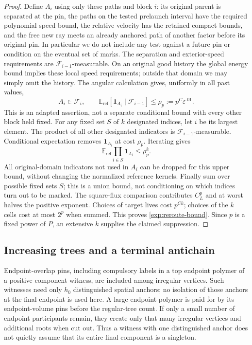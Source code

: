 \begin{proof}
Define $A_i$ using only these paths and block $i$: its original parent is
separated at the pin, the paths on the tested prelaunch interval have the
required polynomial speed bound, the relative velocity has the retained
compact bounds, and the free new ray meets an already anchored path of
another factor before its original pin.  In particular we do not include
any test against a future pin or condition on the eventual set of marks.
The separation and exterior-speed requirements are
$\mathcal F_{i-1}$-measurable.  On an original good history the global
energy bound implies these local speed requirements; outside that domain
we may simply omit the history.  The angular calculation gives, uniformly
in all past values,
\[
 A_i\in\mathcal F_i,\qquad
 \mathbb E_{\mathrm{ref}}[\mathbf1_{A_i}\mid\mathcal F_{i-1}]
 \le\rho_p:=p^C\varepsilon^{.01}.
\]
This is an adapted assertion, not a separate conditional bound with every
other block held fixed.  For any fixed set $S$ of $k$ designated indices,
let $i$ be its largest element.  The product of all other designated
indicators is $\mathcal F_{i-1}$-measurable.  Conditional expectation removes
$\mathbf1_{A_i}$ at cost $\rho_p$.  Iterating gives
\[
 \mathbb E_{\mathrm{ref}}\prod_{i\in S}\mathbf1_{A_i}\le\rho_p^k.
\]
All original-domain indicators not used in $A_i$ can be dropped for this
upper bound, without changing the normalized reference kernels.  Finally
sum over possible fixed sets $S$; this is a union bound, not conditioning
on which indices turn out to be marked.
The square-flux comparison contributes $C_L^p$ and at worst halves the
positive exponent.  Choices of target lives cost $p^{Ck}$; choices of the
$k$ cells cost at most $2^p$ when summed.  This proves
\eqref{exp:reroute-bound}.  Since $p$ is a fixed power of $P$, an extensive
$k$ supplies the claimed suppression.
\end{proof}

\subsection{Increasing trees and a terminal antichain}

Endpoint-overlap pins, including compulsory labels in a top endpoint
polymer of a positive component witness, are included among irregular
vertices.  Such witnesses need only $h_0$ distinguished spatial anchors;
no isolation of those anchors at the final endpoint is used here.  A
large endpoint polymer is paid for by its endpoint-volume pins before the
regular-tree count.  If only a small number of endpoint participants remain,
they create only that many irregular vertices and additional roots when
cut out.  Thus a witness with one distinguished anchor does not quietly
assume that its entire final component is a singleton.

